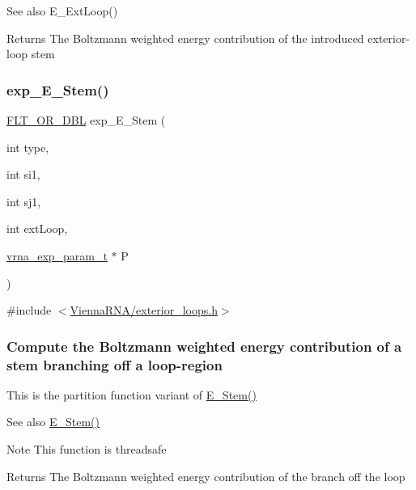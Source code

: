\begin{DoxySeeAlso}{See also}
E\+\_\+\+Ext\+Loop() 
\end{DoxySeeAlso}
\begin{DoxyReturn}{Returns}
The Boltzmann weighted energy contribution of the introduced exterior-\/loop stem 
\end{DoxyReturn}
\mbox{\label{group__loops_gab0aa9833ab41875a91a9be8a5ffd7092}} 
\subsubsection{\texorpdfstring{exp\+\_\+\+E\+\_\+\+Stem()}{exp\_E\_Stem()}}
{\footnotesize\ttfamily \hyperlink{group__data__structures_ga31125aeace516926bf7f251f759b6126}{F\+L\+T\+\_\+\+O\+R\+\_\+\+D\+BL} exp\+\_\+\+E\+\_\+\+Stem (\begin{DoxyParamCaption}\item[{int}]{type,  }\item[{int}]{si1,  }\item[{int}]{sj1,  }\item[{int}]{ext\+Loop,  }\item[{\hyperlink{group__energy__parameters_ga01d8b92fe734df8d79a6169482c7d8d8}{vrna\+\_\+exp\+\_\+param\+\_\+t} $\ast$}]{P }\end{DoxyParamCaption})}



{\ttfamily \#include $<$\hyperlink{exterior__loops_8h}{Vienna\+R\+N\+A/exterior\+\_\+loops.\+h}$>$}

\subsubsection*{Compute the Boltzmann weighted energy contribution of a stem branching off a loop-\/region}

This is the partition function variant of \hyperlink{group__loops_ga51f9851f3500c2aae66674142a6a2dd5}{E\+\_\+\+Stem()} \begin{DoxySeeAlso}{See also}
\hyperlink{group__loops_ga51f9851f3500c2aae66674142a6a2dd5}{E\+\_\+\+Stem()} 
\end{DoxySeeAlso}
\begin{DoxyNote}{Note}
This function is threadsafe
\end{DoxyNote}
\begin{DoxyReturn}{Returns}
The Boltzmann weighted energy contribution of the branch off the loop 
\end{DoxyReturn}
\mbox{\label{group__loops_gadf943ee9a45b7f4cee9192c06210dace}} 
